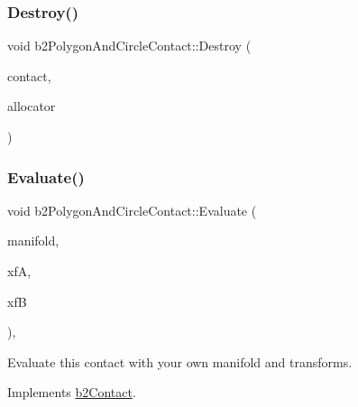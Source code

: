 \mbox{\label{classb2_polygon_and_circle_contact_a04e9a3fcdcf52821fb90b8206b8bb2f0}} 
\subsubsection{\texorpdfstring{Destroy()}{Destroy()}}
{\footnotesize\ttfamily void b2\+Polygon\+And\+Circle\+Contact\+::\+Destroy (\begin{DoxyParamCaption}\item[{\mbox{\hyperlink{classb2_contact}{b2\+Contact}} $\ast$}]{contact,  }\item[{\mbox{\hyperlink{classb2_block_allocator}{b2\+Block\+Allocator}} $\ast$}]{allocator }\end{DoxyParamCaption})\hspace{0.3cm}{\ttfamily [static]}}

\mbox{\label{classb2_polygon_and_circle_contact_a4af8338f124be0b7ec704997be4736b1}} 
\subsubsection{\texorpdfstring{Evaluate()}{Evaluate()}}
{\footnotesize\ttfamily void b2\+Polygon\+And\+Circle\+Contact\+::\+Evaluate (\begin{DoxyParamCaption}\item[{\mbox{\hyperlink{structb2_manifold}{b2\+Manifold}} $\ast$}]{manifold,  }\item[{const \mbox{\hyperlink{structb2_transform}{b2\+Transform}} \&}]{xfA,  }\item[{const \mbox{\hyperlink{structb2_transform}{b2\+Transform}} \&}]{xfB }\end{DoxyParamCaption})\hspace{0.3cm}{\ttfamily [override]}, {\ttfamily [virtual]}}



Evaluate this contact with your own manifold and transforms. 



Implements \mbox{\hyperlink{classb2_contact_ae3c2842e5325b2d4500f8ed1d4de2f72}{b2\+Contact}}.



